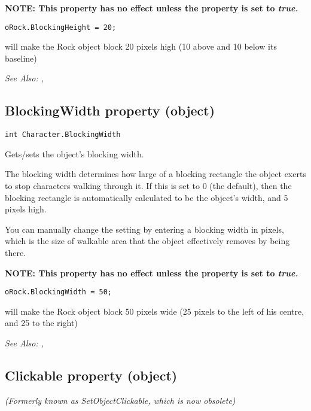 \bf{NOTE:} This property has no effect unless the  property
is set to \it{true}.

\begin{verbatim}
oRock.BlockingHeight = 20;
\end{verbatim}
will make the Rock object block 20 pixels high (10 above and 10 below its baseline)

\it{See Also:} ,


\subsection{BlockingWidth property (object)}\label{Object.BlockingWidth}%

\begin{verbatim}
int Character.BlockingWidth
\end{verbatim}
Gets/sets the object's blocking width.

The blocking width determines how large of a blocking rectangle the object exerts to
stop characters walking through it. If this is set to 0 (the default), then the
blocking rectangle is automatically calculated to be the object's width, and 5 pixels
high.

You can manually change the setting by entering a blocking width in pixels, which is the
size of walkable area that the object effectively removes by being there.

\bf{NOTE:} This property has no effect unless the  property
is set to \it{true}.

\begin{verbatim}
oRock.BlockingWidth = 50;
\end{verbatim}
will make the Rock object block 50 pixels wide (25 pixels to the left of his centre, and 25 to the right)

\it{See Also:} ,


\subsection{Clickable property (object)}\label{Object.Clickable}%

\it{(Formerly known as SetObjectClickable, which is now obsolete)}

